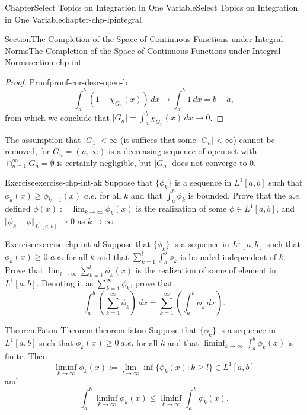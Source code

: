 \documentclass[oneside,10pt,]{book}
\numberwithin{equation}{section}
\begin{document}
\begin{chapterptx}{Chapter}{Select Topics on Integration in One Variable}{}{Select Topics on Integration in One Variable}{}{}{chapter-chp-lpintegral}
\begin{sectionptx}{Section}{The Completion of the Space of Continuous Functions under Integral Norms}{}{The Completion of the Space of Continuous Functions under Integral Norms}{}{}{section-chp-int}
\begin{proof}{Proof}{}{proof-cor-desc-open-b}
\begin{equation*}
\int_{a}^{b}\left( 1- \chi_{G_{n}}(x)\right)\, dx \to \int_{a}^{b} 1\, dx=b-a,
\end{equation*}
from which we conclude that \(|G_{n}|=\int_{a}^{b} \chi_{G_{n}}(x)\, dx \to 0\).%
\end{proof}
The assumption that \(|G_{1}| < \infty\) (it suffices that some \(|G_{n}| < \infty\)) cannot be removed, for \(G_{n}=(n,\infty)\) is a decreasing sequence of open set with \(\cap_{n=1}^{\infty}G_{n}=\emptyset\) is certainly negligible, but \(|G_{n}|\) does not converge to \(0\).%
\begin{inlineexercise}{Exercise}{}{exercise-chp-int-ak}%
Suppose that \(\{\phi_{k}\}\) is a sequence in \(L^{1}[a, b]\) such that \(\phi_{k}(x)\ge \phi_{k+1}(x)\) \(a.e.\) for all \(k\) and that \(\int_{a}^{b} \phi_{k}\) is bounded. Prove that the \(a.e.\) defined \(\phi (x) :=\lim_{k\to \infty} \phi_{k}(x)\) is the realization of some \(\phi \in L^{1}[a, b]\), and \(\Vert \phi_{k}-\phi \Vert_{L^{1}[a, b]}\to 0\) as \(k\to \infty\).%
\end{inlineexercise}%
\begin{inlineexercise}{Exercise}{}{exercise-chp-int-al}%
Suppose that \(\{\phi_{k}\}\) is a sequence in \(L^{1}[a, b]\) such that \(\phi_{k}(x)\ge 0\) \(a.e.\) for all \(k\) and that \(\sum_{k=1 }^{l}\int_{a}^{b} \phi_{k}\) is bounded independent of \(k\). Prove that \(\lim_{l\to\infty} \sum_{k=1 }^{l}\phi_{k}(x)\) is the realization of some of element in \(L^{1}[a, b]\). Denoting it as \(\sum_{k=1 }^{\infty}\phi_{k}\), prove that%
\begin{equation*}
\int_{a}^{b} \left( \sum_{k=1 }^{\infty} \phi_{k}\right)\, dx =
\sum_{k=1 }^{\infty} \left(  \int_{a}^{b} \phi_{k}\, dx\right)\text{.}
\end{equation*}
%
\end{inlineexercise}%
\begin{theorem}{Theorem}{Fatou Theorem.}{}{theorem-fatou}%
Suppose that \(\{\phi_{k}\}\) is a sequence in \(L^{1}[a, b]\) such that \(\phi_{k}(x)\ge 0\)\(\ a.e.\) for all \(k\) and that  \(\liminf_{k\to \infty} \int_{a}^{b} \phi_{k}(x)\) is finite. Then%
\begin{equation*}
\liminf_{k\to \infty} \phi_{k}(x) :=\lim_{l\to \infty} \inf\{\phi_{k}(x): k\ge l\} \in L^{1}[a, b]
\end{equation*}
and%
\begin{equation*}
\int_{a}^{b} \liminf_{k\to \infty} \phi_{k}(x) \le \liminf_{k\to \infty} \int_{a}^{b} \phi_{k}(x).

\end{equation*}
\end{theorem}
\end{sectionptx}
\end{chapterptx}
\end{document}
